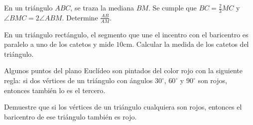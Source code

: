 \begin{problem}[OMAPA 2010/3]
En un triángulo $ABC$, se traza la mediana $BM$.
Se cumple que $BC = \frac23 MC$ y $\angle BMC = 2\angle ABM$.
Determine $\frac{AB}{AM}$.
\end{problem}

\begin{problem}[OMAPA 2011/5]
En un triángulo rectángulo, el segmento que une
el incentro con el baricentro es paralelo a
uno de los catetos y mide $10$cm. Calcular la medida de
los catetos del triángulo.
\end{problem}

\begin{problem}[Iberoamericana 2024]
Algunos puntos del plano Euclídeo son pintados
del color rojo con la siguiente regla:
si dos vértices de un triángulo con ángulos
$30^\circ$, $60^\circ$ y $90^\circ$ son rojos,
entonces también lo es el tercero.

Demuestre que si los vértices de un
triángulo cualquiera son rojos,
entonces el baricentro de ese triángulo
también es rojo.
\end{problem}


